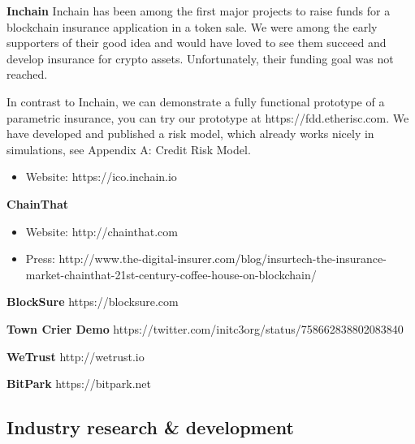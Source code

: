 \documentclass[12pt]{article}
\begin{document}
\textbf{Inchain} Inchain has been among the first major projects to raise funds for a blockchain insurance application in a token sale. We were among the early supporters of their good idea and would have loved to see them succeed and develop insurance for crypto assets. Unfortunately, their funding goal was not reached. 

In contrast to Inchain, we can demonstrate a fully functional prototype of a parametric insurance, you can try our prototype at https://fdd.etherisc.com. We have developed and published a risk model, which already works nicely in simulations, see Appendix A: Credit Risk Model.

\begin{itemize}
    \item Website: https://ico.inchain.io 
\end{itemize}

\textbf{ChainThat}

\begin{itemize}
    \item Website: http://chainthat.com
    \item Press: http://www.the-digital-insurer.com/blog/insurtech-the-insurance-market-chainthat-21st-century-coffee-house-on-blockchain/
\end{itemize}

\textbf{BlockSure} https://blocksure.com

\textbf{Town Crier Demo} https://twitter.com/initc3org/status/758662838802083840

\textbf{WeTrust} http://wetrust.io

\textbf{BitPark} https://bitpark.net

\subsection{Industry research \& development}
\end{document}
